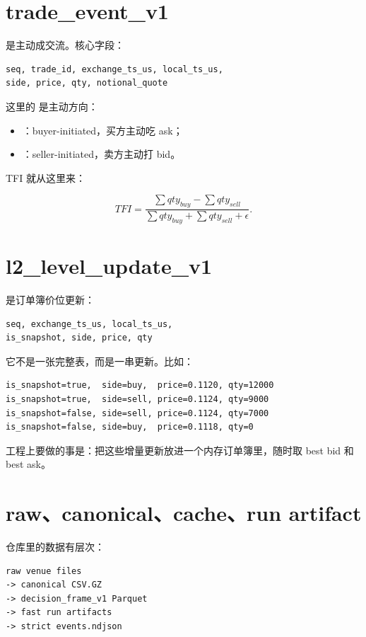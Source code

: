 \section{trade\_event\_v1}

 是主动成交流。核心字段：

\begin{lstlisting}
seq, trade_id, exchange_ts_us, local_ts_us,
side, price, qty, notional_quote
\end{lstlisting}

这里的  是主动方向：

\begin{itemize}[leftmargin=2em]
  \item {}：buyer-initiated，买方主动吃 ask；
  \item {}：seller-initiated，卖方主动打 bid。
\end{itemize}

TFI 就从这里来：

\[
TFI=\frac{\sum qty_{buy}-\sum qty_{sell}}{\sum qty_{buy}+\sum qty_{sell}+\epsilon}.
\]

\section{l2\_level\_update\_v1}

 是订单簿价位更新：

\begin{lstlisting}
seq, exchange_ts_us, local_ts_us,
is_snapshot, side, price, qty
\end{lstlisting}

它不是一张完整表，而是一串更新。比如：

\begin{lstlisting}
is_snapshot=true,  side=buy,  price=0.1120, qty=12000
is_snapshot=true,  side=sell, price=0.1124, qty=9000
is_snapshot=false, side=sell, price=0.1124, qty=7000
is_snapshot=false, side=buy,  price=0.1118, qty=0
\end{lstlisting}

工程上要做的事是：把这些增量更新放进一个内存订单簿里，随时取 best bid 和 best ask。

\section{raw、canonical、cache、run artifact}

仓库里的数据有层次：

\begin{lstlisting}
raw venue files
-> canonical CSV.GZ
-> decision_frame_v1 Parquet
-> fast run artifacts
-> strict events.ndjson
\end{lstlisting}

